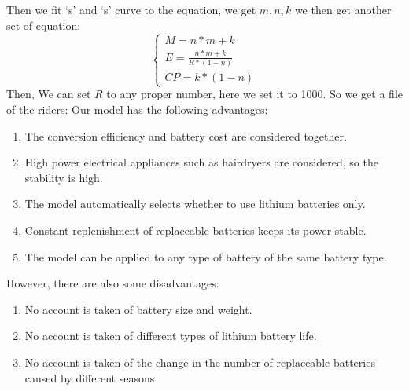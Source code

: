 \documentclass[12pt]{article}
\begin{document}
Then we fit `s' and `s' curve to the equation, we get $m,n,k$ we then get another set of equation:
\begin{equation}
    \left\{
    \begin{array}{c}
        M=n*m+k                 \\
        E=\frac{n*m+k}{R*(1-n)} \\
        CP=k*(1-n)
    \end{array}
    \right.
\end{equation}
Then, We can set $R$ to any proper number, here we set it to 1000. So we get a file of the riders:%
Our model has the following advantages:
\begin{enumerate}
    \item The conversion efficiency and battery cost are considered together.
    \item High power electrical appliances such as hairdryers are considered, so the stability is high.
    \item The model automatically selects whether to use lithium batteries only.
    \item Constant replenishment of replaceable batteries keeps its power stable.
    \item The model can be applied to any type of battery of the same battery type.
\end{enumerate}
However, there are also some disadvantages:
\begin{enumerate}
    \item No account is taken of battery size and weight.
    \item No account is taken of different types of lithium battery life.
    \item No account is taken of the change in the number of replaceable batteries caused by different seasons
\end{enumerate}
\end{document}
